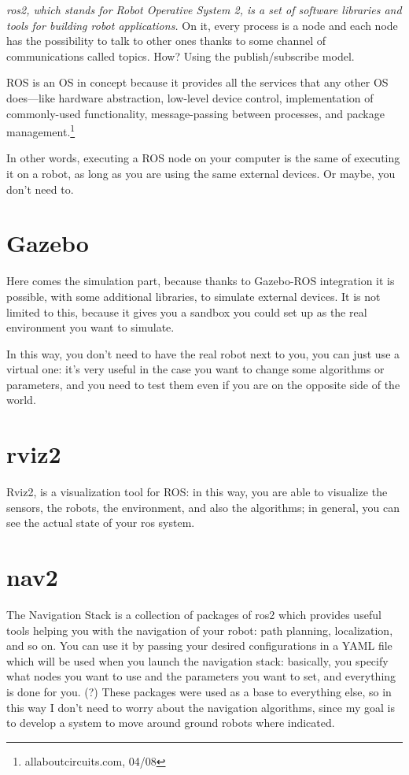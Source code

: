 {\it \Acrshort{ros}2, which stands for Robot Operative System 2, is a set of software libraries and tools for building robot applications.}\cite{ros2desc} On it, every process is a node and each node has the possibility to talk to other ones thanks to some channel of communications called topics. How? Using the publish/subscribe model.

ROS is an OS in concept because it provides all the services that any other OS does—like hardware abstraction, low-level device control, implementation of commonly-used functionality, message-passing between processes, and package management.\footnote{allaboutcircuits.com, 04/08}

In other words, executing a ROS node on your computer is the same of executing it on a robot, as long as you are using the same external devices. Or maybe, you don't need to.

\section{Gazebo}

Here comes the simulation part, because thanks to Gazebo-ROS integration it is possible, with some additional libraries, to simulate external devices. It is not limited to this, because it gives you a sandbox you could set up as the real environment you want to simulate.

In this way, you don't need to have the real robot next to you, you can just use a virtual one: it's very useful in the case you want to change some algorithms or parameters, and you need to test them even if you are on the opposite side of the world.


\section{rviz2}

Rviz2, is a visualization tool for ROS: in this way, you are able to visualize the sensors, the robots, the environment, and also the algorithms; in general, you can see the actual state of your \Acrshort{ros} system.

\section{\Acrfull{nav2}}

The Navigation Stack is a collection of packages of \Acrshort{ros}2 which provides useful tools helping you with the navigation of your robot: path planning, localization, and so on. You can use it by passing your desired configurations in a YAML file which will be used when you launch the navigation stack: basically, you specify what nodes you want to use and the parameters you want to set, and everything is done for you. (?)
These packages were used as a base to everything else, so in this way I don't need to worry about the navigation algorithms, since my goal is to develop a system to move around ground robots where indicated.

